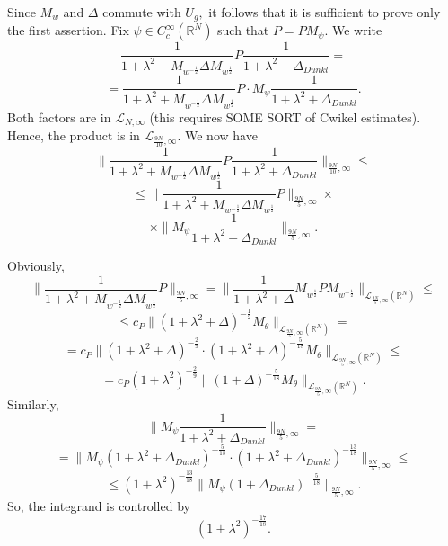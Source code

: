 \documentclass{amsart}
\begin{document}
Since $M_w$ and $\Delta$ commute with $U_g,$ it follows that it is sufficient to prove only the first assertion. Fix $\psi\in C^{\infty}_c(\mathbb{R}^N)$ such that $P=PM_{\psi}.$ We write
$$\frac1{1+\lambda^2+M_{w^{-\frac12}}\Delta M_{w^{\frac12}}}P\frac1{1+\lambda^2+\Delta_{Dunkl}}=$$
$$=\frac1{1+\lambda^2+M_{w^{-\frac12}}\Delta M_{w^{\frac12}}}P\cdot M_{\psi}\frac1{1+\lambda^2+\Delta_{Dunkl}}.$$
Both factors are in $\mathcal{L}_{N,\infty}$ (this requires SOME SORT of Cwikel estimates). Hence, the product is in $\mathcal{L}_{\frac{9N}{10},\infty}.$ We now have
$$\|\frac1{1+\lambda^2+M_{w^{-\frac12}}\Delta M_{w^{\frac12}}}P\frac1{1+\lambda^2+\Delta_{Dunkl}}\|_{\frac{9N}{10},\infty}\leq$$
$$\leq\|\frac1{1+\lambda^2+M_{w^{-\frac12}}\Delta M_{w^{\frac12}}}P\|_{\frac{9N}{5},\infty}\times$$
$$\times\|M_{\psi}\frac1{1+\lambda^2+\Delta_{Dunkl}}\|_{\frac{9N}{5},\infty}.$$

Obviously,
$$\|\frac1{1+\lambda^2+M_{w^{-\frac12}}\Delta M_{w^{\frac12}}}P\|_{\frac{9N}{5},\infty}=\|\frac1{1+\lambda^2+\Delta }M_{w^{\frac12}}PM_{w^{-\frac12}}\|_{\mathcal{L}_{\frac{9N}{5},\infty}(\mathbb{R}^N)}\leq$$
$$\leq c_P\|(1+\lambda^2+\Delta)^{-\frac12}M_{\theta}\|_{\mathcal{L}_{\frac{9N}{5},\infty}(\mathbb{R}^N)}=$$
$$=c_P\|(1+\lambda^2+\Delta)^{-\frac{2}{9}}\cdot(1+\lambda^2+\Delta)^{-\frac{5}{18}}M_{\theta}\|_{\mathcal{L}_{\frac{9N}{5},\infty}(\mathbb{R}^N)}\leq$$
$$=c_P(1+\lambda^2)^{-\frac29}\|(1+\Delta)^{-\frac{5}{18}}M_{\theta}\|_{\mathcal{L}_{\frac{9N}{5},\infty}(\mathbb{R}^N)}.$$
Similarly,
$$\|M_{\psi}\frac1{1+\lambda^2+\Delta_{Dunkl}}\|_{\frac{9N}{5},\infty}=$$
$$=\|M_{\psi}(1+\lambda^2+\Delta_{Dunkl})^{-\frac{5}{18}}\cdot(1+\lambda^2+\Delta_{Dunkl})^{-\frac{13}{18}}\|_{\frac{9N}{5},\infty}\leq$$
$$\leq (1+\lambda^2)^{-\frac{13}{18}}\|M_{\psi}(1+\Delta_{Dunkl})^{-\frac{5}{18}}\|_{\frac{9N}{5},\infty}.$$
So, the integrand is controlled by
$$(1+\lambda^2)^{-\frac{17}{18}}.$$
\end{document}
